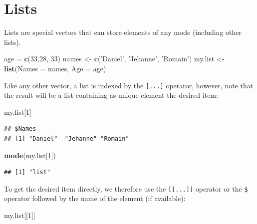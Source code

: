 \documentclass[]{book}
\newenvironment{Shaded}{\begin{snugshade}}{\end{snugshade}}
\newcommand{\DataTypeTok}[1]{\textcolor[rgb]{0.13,0.29,0.53}{#1}}
\newcommand{\DecValTok}[1]{\textcolor[rgb]{0.00,0.00,0.81}{#1}}
\newcommand{\KeywordTok}[1]{\textcolor[rgb]{0.13,0.29,0.53}{\textbf{#1}}}
\newcommand{\NormalTok}[1]{#1}
\newcommand{\StringTok}[1]{\textcolor[rgb]{0.31,0.60,0.02}{#1}}
\begin{document}
\hypertarget{lists}{%
\section{Lists}\label{lists}}

Lists are special vectors that can store elements of any mode (including other lists).

\begin{Shaded}
\begin{Highlighting}[]
\NormalTok{age =}\StringTok{ }\KeywordTok{c}\NormalTok{(}\DecValTok{33}\NormalTok{,}\DecValTok{28}\NormalTok{, }\DecValTok{33}\NormalTok{)}
\NormalTok{names <-}\StringTok{ }\KeywordTok{c}\NormalTok{(}\StringTok{'Daniel'}\NormalTok{, }\StringTok{'Jehanne'}\NormalTok{, }\StringTok{'Romain'}\NormalTok{)}
\NormalTok{my.list <-}\StringTok{ }\KeywordTok{list}\NormalTok{(}\DataTypeTok{Names =}\NormalTok{ names, }\DataTypeTok{Age =}\NormalTok{ age)}
\end{Highlighting}
\end{Shaded}

Like any other vector, a list is indexed by the \texttt{{[}...{]}} operator, however, note that the result will be a list containing as unique element the desired item:

\begin{Shaded}
\begin{Highlighting}[]
\NormalTok{my.list[}\DecValTok{1}\NormalTok{]}
\end{Highlighting}
\end{Shaded}

\begin{verbatim}
## $Names
## [1] "Daniel"  "Jehanne" "Romain"
\end{verbatim}

\begin{Shaded}
\begin{Highlighting}[]
\KeywordTok{mode}\NormalTok{(my.list[}\DecValTok{1}\NormalTok{])}
\end{Highlighting}
\end{Shaded}

\begin{verbatim}
## [1] "list"
\end{verbatim}

To get the desired item directly, we therefore use the \texttt{{[}{[}...{]}{]}} operator or the \texttt{\$} operator followed by the name of the element (if available):

\begin{Shaded}
\begin{Highlighting}[]
\NormalTok{my.list[[}\DecValTok{1}\NormalTok{]]}
\end{Highlighting}
\end{Shaded}
\end{document}
